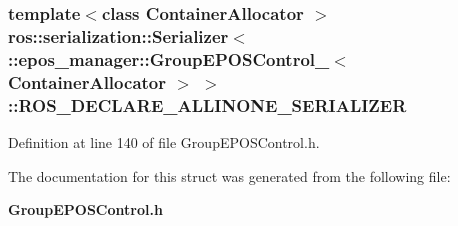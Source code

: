 \subsubsection[{\-R\-O\-S\-\_\-\-D\-E\-C\-L\-A\-R\-E\-\_\-\-A\-L\-L\-I\-N\-O\-N\-E\-\_\-\-S\-E\-R\-I\-A\-L\-I\-Z\-E\-R}]{\setlength{\rightskip}{0pt plus 5cm}template$<$class Container\-Allocator $>$ ros\-::serialization\-::\-Serializer$<$ \-::{\bf epos\-\_\-manager\-::\-Group\-E\-P\-O\-S\-Control\-\_\-}$<$ \-Container\-Allocator $>$ $>$\-::{\bf \-R\-O\-S\-\_\-\-D\-E\-C\-L\-A\-R\-E\-\_\-\-A\-L\-L\-I\-N\-O\-N\-E\-\_\-\-S\-E\-R\-I\-A\-L\-I\-Z\-E\-R}}\label{structros_1_1serialization_1_1Serializer_3_01_1_1epos__manager_1_1GroupEPOSControl___3_01ContainerAllocator_01_4_01_4_a7bfb6610b383c7d3d229835d1da58cf7}


\-Definition at line 140 of file \-Group\-E\-P\-O\-S\-Control.\-h.



\-The documentation for this struct was generated from the following file\-:\begin{DoxyCompactItemize}
\item 
{\bf \-Group\-E\-P\-O\-S\-Control.\-h}\end{DoxyCompactItemize}
